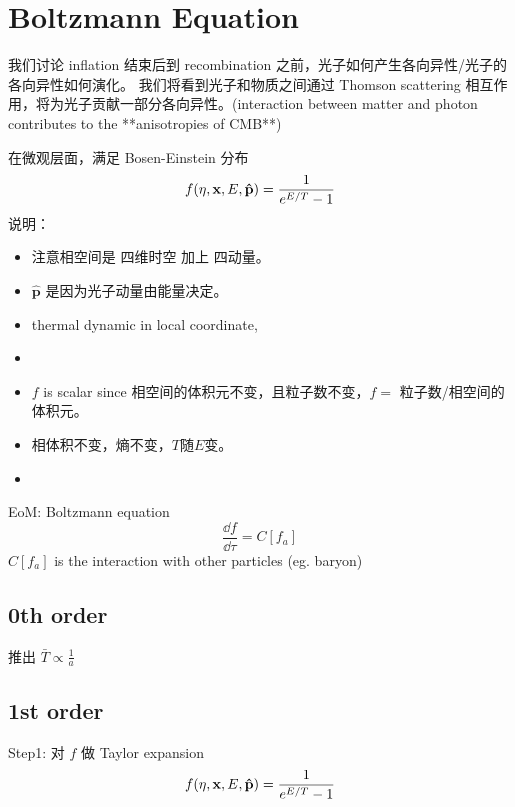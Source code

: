 
\section{Boltzmann Equation}

我们讨论 inflation 结束后到 recombination 之前，光子如何产生各向异性/光子的各向异性如何演化。
我们将看到光子和物质之间通过 Thomson scattering 相互作用，将为光子贡献一部分各向异性。(interaction between matter and photon contributes to the **anisotropies of CMB**)

在微观层面，满足 Bosen-Einstein 分布 
\begin{equation}
    f\qty(\eta, \mathbf{x}, E, \mathbf{\hat{p}}) = \frac{1}{e^{E/T}-1}
\end{equation}
说明：  
\begin{itemize}
    \item 注意相空间是 四维时空 加上 四动量。
    \item $\mathbf{\hat{p}}$ 是因为光子动量由能量决定。
    \item thermal dynamic in local coordinate, 
    \item {}
    \item $f$ is scalar since 相空间的体积元不变，且粒子数不变，$f=$  粒子数/相空间的体积元。
    \item 相体积不变，熵不变，$T$随$E$变。
    \item {}
\end{itemize}


EoM: Boltzmann equation
\begin{equation}
    \frac{\dd f}{\dd \tau} = C[f_a]
\end{equation}
$C[f_a]$ is the interaction with other particles (eg. baryon)

\subsection{0th order}

推出 $\bar{T} \propto \frac{1}{a}$ 

\subsection{1st order}

Step1: 对 $f$ 做 Taylor expansion 
\begin{gather}
    f\qty(\eta, \mathbf{x}, E, \mathbf{\hat{p}}) = \frac{1}{e^{E/T}-1}
\end{gather}

